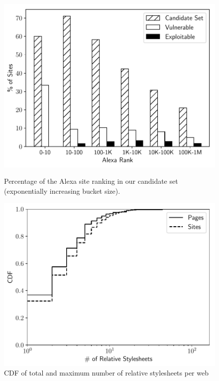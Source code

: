\begin{figure}[t]
\centering
\begin{minipage}{.32\textwidth}
    \includegraphics[width=1\textwidth,height=.8\textwidth]{rpo/figures/alexa_rank}
    \caption{Percentage of the Alexa site ranking in our candidate set
             (exponentially increasing bucket size).}
    \label{rpo:fig:analysis:alexa_rank}
\end{minipage}
\hfill
\begin{minipage}{.32\textwidth}
    \includegraphics[width=1\textwidth,height=.8\textwidth]{rpo/figures/relative_stylesheets}
    \caption{CDF of total and maximum number of relative stylesheets per web
}
\end{minipage}
\end{figure}
